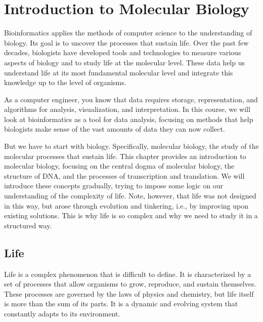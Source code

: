 \chapter{Introduction to Molecular Biology}
\label{ch:intro-mol-biol}
Bioinformatics 
applies the methods of computer science to the understanding of biology. 
Its goal is to uncover the processes that sustain life. Over the past few decades, biologists have developed tools and technologies to measure various aspects of biology and to study life at the molecular level. These data help us understand life at its most fundamental molecular level and integrate this knowledge up to the level of organisms. 

As a computer engineer, you know that data requires storage, representation, and algorithms for analysis, visualization, and interpretation. In this course, we will look at bioinformatics as a tool for data analysis, focusing on methods that help biologists make sense of the vast amounts of data they can now collect.

But we have to start with biology. Specifically, molecular biology, the study of the molecular processes that sustain life. This chapter provides an introduction to molecular biology, focusing on the central dogma of molecular biology, the structure of DNA, and the processes of transcription and translation. We will introduce these concepts gradually, trying to impose some logic on our understanding of the complexity of life. Note, however, that life was not designed in this way, but arose through evolution and tinkering, i.e., by improving upon existing solutions. This is why life is so complex and why we need to study it in a structured way.

\vspace*{5mm}
\section{Life}

Life is a complex phenomenon
that is difficult to define. It is characterized by a set of processes that allow organisms to grow, reproduce, and sustain themselves. These processes are governed by the laws of physics and chemistry, but life itself is more than the sum of its parts. It is a dynamic and evolving system that constantly adapts to its environment.

